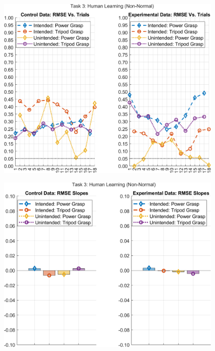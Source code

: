 \documentclass[12pt]{article}
\newcommand\figWidth{7in}
\begin{document}
\newpage
\clearpage
\begin{figure}
    \includegraphics[width = \figWidth]{t3-rmse-xnorm.png}
\end{figure}
\begin{figure}
    \includegraphics[width = \figWidth]{t3-bar-xnorm.png}
\end{figure}
\end{document}
